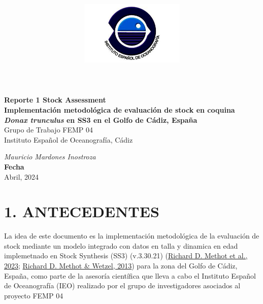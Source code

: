 \documentclass[
]{article}
\title{\includegraphics[width=5cm,height=\textheight]{IEO-logo.jpg}}
\author{}
\date{\vspace{-2.5em}}
\begin{document}
\maketitle



\begin{flushleft}
\Large{\textbf{Reporte 1 Stock Assessment}}\\
\vspace*{2\baselineskip}
\LARGE{\textbf{Implementación metodológica de evaluación de stock en coquina \textit{Donax trunculus} en SS3 en el Golfo de Cádiz, España}}\\
\vspace*{5\baselineskip}
\Large{Grupo de Trabajo FEMP 04}\\
\vspace*{1\baselineskip}
\Large{Instituto Español de Oceanografía, Cádiz }\\
\vspace*{4\baselineskip}
\end{flushleft}
\begin{flushright}
\large{\textit{Mauricio Mardones Inostroza}}\\
\vspace*{1\baselineskip}
\normalsize{\textbf{Fecha}}\\
Abril, 2024
\end{flushright}



\hypersetup{linkcolor = black}
\newpage
{}

\newpage



\hypersetup{linkcolor = blue}

{
\hypersetup{linkcolor=}
\setcounter{tocdepth}{3}
\tableofcontents
}
\pagebreak

\hypertarget{antecedentes}{%
\section{1. ANTECEDENTES}\label{antecedentes}}

La idea de este documento es la implementación metodológica de la evaluación de stock mediante un modelo integrado con datos en talla y dinamica en edad implemetnado en Stock Synthesis (SS3) (v.3.30.21) (\protect\hyperlink{ref-Methot2023}{Richard D. Methot et al., 2023}; \protect\hyperlink{ref-Methot2013}{Richard D. Methot \& Wetzel, 2013}) para la zona del Golfo de Cádiz, España, como parte de la asesoría científica que lleva a cabo el Instituto Español de Oceanografía (IEO) realizado por el grupo de investigadores asociados al proyecto FEMP 04
\end{document}
